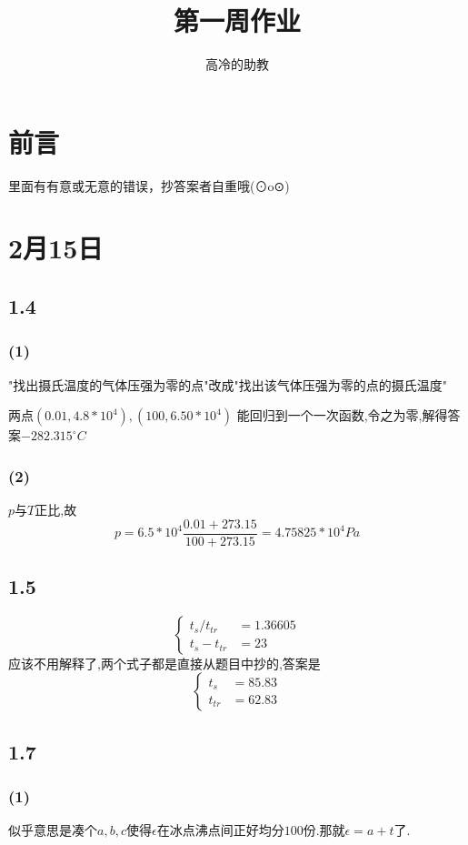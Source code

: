 \documentclass{article}
\title{第一周作业}
\author{高冷的助教}
\begin{document}
\maketitle
\section*{前言}
里面有有意或无意的错误，抄答案者自重哦(⊙o⊙)
\section{2月15日}
\subsection*{1.4}
\subsubsection*{(1)}
"找出摄氏温度的气体压强为零的点"改成"找出该气体压强为零的点的摄氏温度"

两点$(0.01, 4.8*10^4), (100, 6.50*10^4)$
能回归到一个一次函数,令之为零,解得答案$-282.315^{\circ}C$

\subsubsection*{(2)}
$p$与$T$正比,故
\begin{equation}
p=6.5*10^4 \frac{0.01 + 273.15}{100 + 273.15}=4.75825*10^4 Pa
\end{equation}
\subsection*{1.5}
\begin{equation}
	\left\{\begin{aligned}
	t_s/t_{tr}&=1.36605\\
	t_s-t_{tr}&=23
	\end{aligned}\right.
\end{equation}
应该不用解释了,两个式子都是直接从题目中抄的,答案是
\begin{equation}
\left\{\begin{aligned}
t_s &= 85.83\\
t_{tr}&=62.83
\end{aligned}\right.
\end{equation}
\subsection*{1.7}
\subsubsection*{(1)}
似乎意思是凑个$a,b,c$使得$\epsilon$在冰点沸点间正好均分$100$份.那就$\epsilon=a+t$了.
\end{document}
